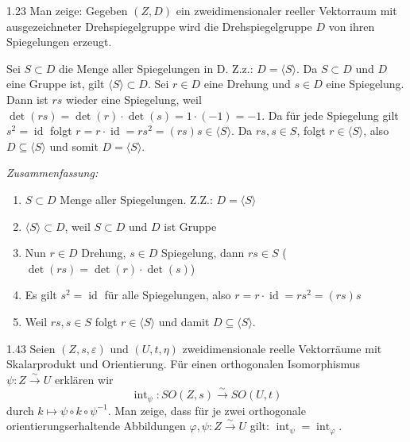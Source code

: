 \begin{exercise}{1.2}{3}
    Man zeige: Gegeben $(Z, D)$ ein zweidimensionaler reeller Vektorraum mit ausgezeichneter Drehspiegelgruppe wird die Drehspiegelgruppe $D$
    von ihren Spiegelungen erzeugt.
\end{exercise}
Sei $S \subset D$ die Menge aller Spiegelungen in D. Z.z.: $D = \langle S\rangle$.
Da $S \subset D$ und $D$ eine Gruppe ist, gilt $\langle S\rangle \subset D$.
Sei $r \in D$ eine Drehung und $s \in D$ eine Spiegelung. Dann ist $rs$ wieder eine Spiegelung, weil
$\operatorname{det}(rs) = \operatorname{det}(r) \cdot \operatorname{det}(s) = 1 \cdot (-1) = -1$.
Da für jede Spiegelung gilt $s^2 = \operatorname{id}$ folgt $r = r\cdot \operatorname{id} = rs^2 = (rs)s \in \langle S\rangle$.
Da $rs, s \in S$, folgt $r \in \langle S \rangle$, also $D \subseteq \langle S\rangle$ und somit $D = \langle S\rangle$.

\textit{Zusammenfassung:}
\begin{enumerate}
    \item $S \subset D$ Menge aller Spiegelungen. Z.Z.: $D = \langle S\rangle$
    \item $\langle S\rangle \subset D$, weil $S \subset D$ und $D$ ist Gruppe
    \item Nun $r \in D$ Drehung, $s \in D$ Spiegelung, dann $rs \in S$ ($\operatorname{det}(rs) = \operatorname{det}(r) \cdot \operatorname{det}(s)$)
    \item Es gilt $s^2 = \operatorname{id}$ für alle Spiegelungen, also $r = r\cdot \operatorname{id} = rs^2 = (rs)s$
    \item Weil $rs, s \in S$ folgt $r \in \langle S\rangle$ und damit $D \subseteq \langle S \rangle$.
\end{enumerate}


\begin{exercise}{1.4}{3}
    Seien \((Z,s,\varepsilon)\) und \((U,t,\eta)\) zweidimensionale reelle
    Vektorräume mit Skalarprodukt und Orientierung. Für einen orthogonalen
    Isomorphismus $\psi:Z\xrightarrow{\sim} U$
    erklären wir
    \[
    \operatorname{int}_{\psi}:SO(Z,s)\xrightarrow{\sim}SO(U,t)
    \]
    durch $k\mapsto \psi\circ k\circ \psi^{-1}.$
    Man zeige, dass für je zwei orthogonale orientierungserhaltende Abbildungen
    $\varphi,\psi:Z\xrightarrow{\sim} U$
    gilt:
    $\operatorname{int}_{\psi}=\operatorname{int}_{\varphi}.$
\end{exercise}

